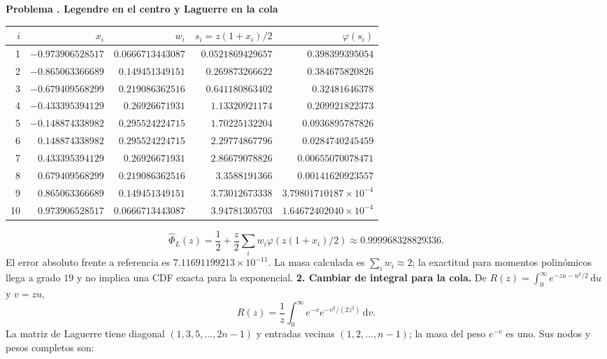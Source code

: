 \documentclass[11pt,a4paper]{article}
\newcommand{\dd}{\,\mathrm d}
\theoremstyle{definition}
\newcounter{problema}
\newenvironment{resuelto}[1]{\refstepcounter{problema}\par\medskip\Needspace{6\baselineskip}\textbf{Problema \theproblema. #1}\par}{\par\medskip}
\begin{document}
\begin{resuelto}{Legendre en el centro y Laguerre en la cola}
\begin{center}\small\begin{tabular}{rrrrr}
\toprule
$i$&$x_i$&$w_i$&$s_i=z(1+x_i)/2$&$\varphi(s_i)$\\
\midrule
1&$-0.973906528517$&$0.0666713443087$&$0.0521869429657$&$0.398399395054$\\
2&$-0.865063366689$&$0.149451349151$&$0.269873266622$&$0.384675820826$\\
3&$-0.679409568299$&$0.219086362516$&$0.641180863402$&$0.32481646378$\\
4&$-0.433395394129$&$0.26926671931$&$1.13320921174$&$0.209921822373$\\
5&$-0.148874338982$&$0.295524224715$&$1.70225132204$&$0.0936895787826$\\
6&$0.148874338982$&$0.295524224715$&$2.29774867796$&$0.0284740245459$\\
7&$0.433395394129$&$0.26926671931$&$2.86679078826$&$0.00655070078471$\\
8&$0.679409568299$&$0.219086362516$&$3.3588191366$&$0.00141620923557$\\
9&$0.865063366689$&$0.149451349151$&$3.73012673338$&$3.79801710187\times10^{-4}$\\
10&$0.973906528517$&$0.0666713443087$&$3.94781305703$&$1.64672402040\times10^{-4}$\\
\bottomrule\end{tabular}\end{center}
\[
\widehat\Phi_L(z)=\frac12+\frac z2\sum_iw_i\varphi(z(1+x_i)/2)\approx0.999968328829336.
\]
El error absoluto frente a referencia es $7.11691199213\times10^{-11}$. La masa calculada es $\sum_iw_i\approx2$; la exactitud para momentos polinómicos llega a grado $19$ y no implica una CDF exacta para la exponencial.
\textbf{2. Cambiar de integral para la cola.} De $R(z)=\int_0^\infty e^{-zu-u^2/2}\dd u$ y $v=zu$,
\[
R(z)=\frac1z\int_0^\infty e^{-v}e^{-v^2/(2z^2)}\dd v.
\]
La matriz de Laguerre tiene diagonal $(1,3,5,\ldots,2n-1)$ y entradas vecinas $(1,2,\ldots,n-1)$; la masa del peso $e^{-v}$ es uno. Sus nodos y pesos completos son:


\end{resuelto}
\end{document}
